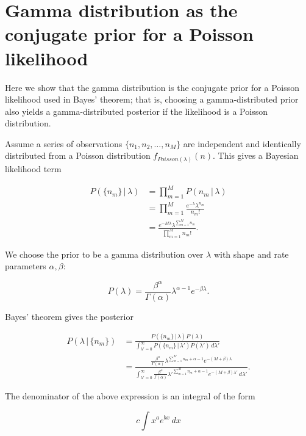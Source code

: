 \documentclass[12pt]{article}
\begin{document}
\section{Gamma distribution as the conjugate prior for a Poisson likelihood}
\label{a:conjugate_derivation}
Here we show that the gamma distribution is the conjugate prior for a Poisson likelihood used in Bayes' theorem; that is, choosing a gamma-distributed prior also yields a gamma-distributed posterior if the likelihood is a Poisson distribution.

Assume a series of observations $\{n_1, n_2, \ldots, n_M\}$ are independent and identically distributed from a Poisson distribution $f_{Poisson(\lambda)}(n)$. This gives a Bayesian likelihood term

\begin{align}
P(\{n_m\}\,|\,\lambda) &= \prod_{m = 1}^{M} P(n_m\,|\,\lambda) \\[5pt]
&= \prod_{m = 1}^{M} \frac{e^{-\lambda} \lambda^{n_m}}{n_m!} \\[5pt]
&= \frac{e^{-M\lambda} \lambda^{\sum_{m = 1}^{M} n_m}}{\prod_{m = 1}^{M} n_m!}.
\end{align}

We choose the prior to be a gamma distribution over $\lambda$ with shape and rate parameters $\alpha, \beta$:

\begin{equation}
P(\lambda) = \frac{\beta^{\alpha}}{\Gamma(\alpha)} \lambda^{\alpha - 1} e^{-\beta \lambda}.
\end{equation}

Bayes' theorem gives the posterior

\begin{align}
P(\lambda\,|\,\{n_m\}) &= \frac{P(\{n_m\}\,|\,\lambda) P(\lambda)}{\int_{\lambda' = 0}^{\infty} P(\{n_m\}\,|\,\lambda') P(\lambda') \, d\lambda'} \\[5pt]
&= \frac{\frac{\beta^{\alpha}}{\Gamma(\alpha)} \lambda^{\sum_{m = 1}^{M} n_m + \alpha - 1} e^{-(M + \beta) \lambda}}{\int_{\lambda' = 0}^{\infty} \frac{\beta^{\alpha}}{\Gamma(\alpha)} \lambda'^{\sum_{m = 1}^{M} n_m + \alpha - 1} e^{-(M + \beta) \lambda'} \, d\lambda'}.
\label{e:eq32}
\end{align}

The denominator of the above expression is an integral of the form

\begin{equation}
\label{e:eq33}
c \int x^a e^{bx} \, dx
\end{equation}
\end{document}
